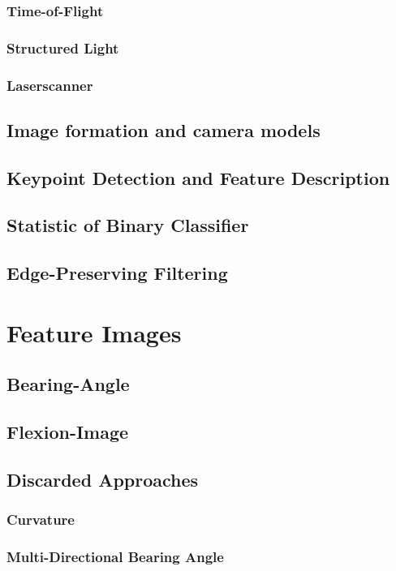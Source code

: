 \subsubsection{Time-of-Flight}
\subsubsection{Structured Light}
\subsubsection{Laserscanner}

\subsection{Image formation and camera models}

\subsection{Keypoint Detection and Feature Description}
\subsection{Statistic of Binary Classifier}
\subsection{Edge-Preserving Filtering}

\section{Feature Images}

\subsection{Bearing-Angle}
\subsection{Flexion-Image}
\subsection{Discarded Approaches}
\subsubsection{Curvature}
\subsubsection{Multi-Directional Bearing Angle}

